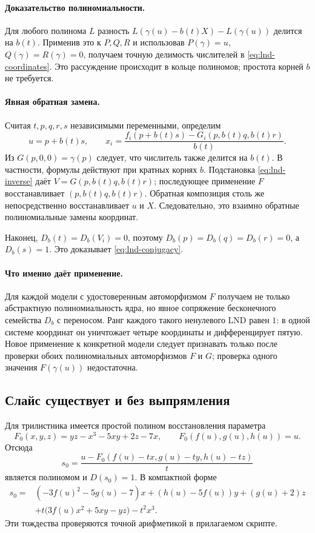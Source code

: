\paragraph{Доказательство полиномиальности.}
Для любого полинома $L$ разность $L(\gamma(u)-b(t)X)-L(\gamma(u))$
делится на $b(t)$. Применив это к $P,Q,R$ и использовав
$P(\gamma)=u$, $Q(\gamma)=R(\gamma)=0$, получаем точную делимость
числителей в \eqref{eq:lnd-coordinates}. Это рассуждение происходит
в кольце полиномов; простота корней $b$ не требуется.

\paragraph{Явная обратная замена.}
Считая $t,p,q,r,s$ независимыми переменными, определим
\begin{equation}\label{eq:lnd-inverse}
 u=p+b(t)s,\qquad
 x_i=\frac{f_i(p+b(t)s)-G_i(p,b(t)q,b(t)r)}{b(t)}.
\end{equation}
Из $G(p,0,0)=\gamma(p)$ следует, что числитель также делится на
$b(t)$. В частности, формулы действуют при кратных корнях $b$.
Подстановка \eqref{eq:lnd-inverse} даёт
$V=G(p,b(t)q,b(t)r)$; последующее применение $F$ восстанавливает
$(p,b(t)q,b(t)r)$. Обратная композиция столь же непосредственно
восстанавливает $u$ и $X$. Следовательно, это взаимно обратные
полиномиальные замены координат.

Наконец, $D_b(t)=D_b(V_i)=0$, поэтому $D_b(p)=D_b(q)=D_b(r)=0$,
а $D_b(s)=1$. Это доказывает \eqref{eq:lnd-conjugacy}.

\paragraph{Что именно даёт применение.}
Для каждой модели с удостоверенным автоморфизмом $F$ получаем не только
абстрактную полиномиальность ядра, но явное сопряжение бесконечного
семейства $D_b$ с переносом. Ранг каждого такого ненулевого LND равен
$1$: в одной системе координат он уничтожает четыре координаты и
дифференцирует пятую. Новое применение к конкретной модели следует
признавать только после проверки обоих полиномиальных автоморфизмов
$F$ и $G$; проверка одного значения $F(\gamma(u))$ недостаточна.

\subsection{Слайс существует и без выпрямления}

Для трилистника имеется простой полином восстановления параметра
\[
 F_0(x,y,z)=yz-x^3-5xy+2z-7x,\qquad
 F_0(f(u),g(u),h(u))=u.
\]
Отсюда
\[
 s_0=\frac{u-F_0(f(u)-tx,g(u)-ty,h(u)-tz)}{t}
\]
является полиномом и $D(s_0)=1$. В компактной форме
\begin{align*}
 s_0={}&(-3f(u)^2-5g(u)-7)x+(h(u)-5f(u))y+(g(u)+2)z\\
       &+t\bigl(3f(u)x^2+5xy-yz\bigr)-t^2x^3.
\end{align*}
Эти тождества проверяются точной арифметикой в прилагаемом скрипте.

